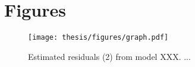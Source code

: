 \section{Figures}

\begin{figure}[ht]
    \begin{center}
        \texttt{[image: thesis/figures/graph.pdf]}
        \caption{Estimated residuals (2) from model XXX. ...}
        \label{Fig:Resids2}
    \end{center}
\end{figure}
